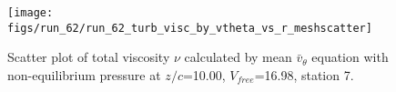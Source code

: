 \begin{figure}[H]
\centering
\texttt{[image: figs/run\_62/run\_62\_turb\_visc\_by\_vtheta\_vs\_r\_meshscatter]}
\caption{Scatter plot of total viscosity $\nu$ calculated by mean $\bar{v}_{\theta}$ equation with non-equilibrium pressure at $z/c$=10.00, $V_{free}$=16.98, station 7.}
\label{fig:run_62_turb_visc_by_vtheta_vs_r_meshscatter}
\end{figure}


